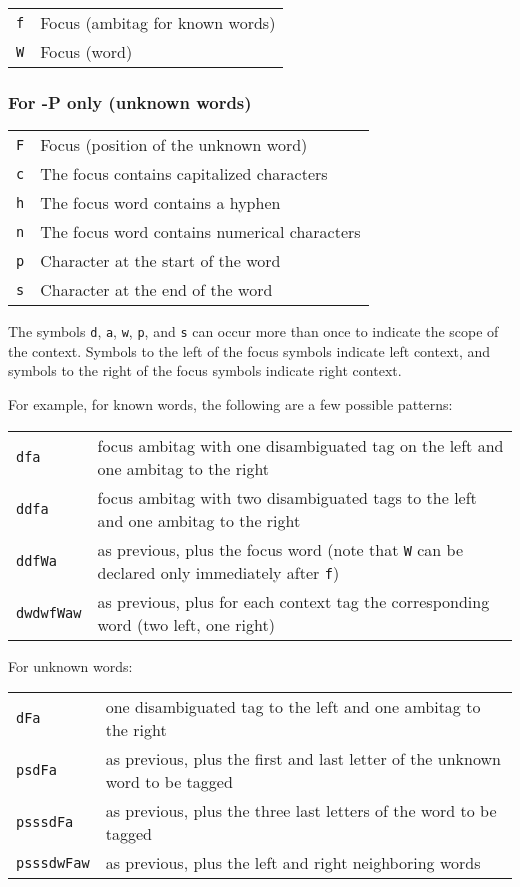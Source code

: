 \documentclass{report}
\begin{document}
\begin{tabular}{ll}
{\tt f} & Focus (ambitag for known words)\\
{\tt W} & Focus (word)\\
\end{tabular}

\subsubsection{For -P only (unknown words)}

\begin{tabular}{ll}
{\tt F} & Focus (position of the unknown word) \\
{\tt c} & The focus contains capitalized characters \\
{\tt h} & The focus word contains a hyphen\\
{\tt n} & The focus word contains numerical characters \\
{\tt p} & Character at the start of the word \\
{\tt s} & Character at the end of the word \\
\end{tabular}

The symbols {\tt d}, {\tt a}, {\tt w}, {\tt p}, and {\tt s} can occur
more than once to indicate the scope of the context. Symbols to the
left of the focus symbols indicate left context, and symbols to the
right of the focus symbols indicate right context.

For example, for known words, the following are a few possible patterns: 

\begin{tabular}{ll}
{\tt dfa}  & focus ambitag with one disambiguated tag on the left and one ambitag to the right \\
{\tt ddfa} & focus ambitag with two disambiguated tags to the left and one ambitag to the right \\ 
{\tt ddfWa} & as previous, plus the focus word (note that {\tt W} can be declared only immediately after {\tt f}) \\
{\tt dwdwfWaw} & as previous, plus for each context tag the corresponding word (two left, one right)\\ 
\end{tabular}

For unknown words:

\begin{tabular}{ll}
{\tt dFa} & one disambiguated tag to the left and one ambitag to the right \\
{\tt psdFa} & as previous, plus the first and last letter of the unknown word to be tagged \\ 
{\tt psssdFa} & as previous, plus the three last letters of the word to be tagged \\
{\tt psssdwFaw} & as previous, plus the left and right neighboring words \\
\end{tabular}
\end{document}
